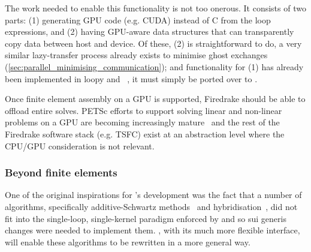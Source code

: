 \documentclass[thesis]{subfiles}
\begin{document}
The work needed to enable this functionality is not too onerous.
It consists of two parts:
(1) generating GPU code (e.g. CUDA) instead of C from the loop expressions, and
(2) having GPU-aware data structures that can transparently copy data between host and device.
Of these, (2) is straightforward to do, a very similar lazy-transfer process already exists to minimise ghost exchanges (\cref{sec:parallel_minimising_communication}); and functionality for (1) has already been implemented in loopy and ~\cite{fenics2021-kulkarni}, it must simply be ported over to .

Once finite element assembly on a GPU is supported, Firedrake should be able to offload entire solves.
PETSc efforts to support solving linear and non-linear problems on a GPU are becoming increasingly mature~\cite{MILLS2021102831,millsPETScTAODevelopments2024}
and the rest of the Firedrake software stack (e.g. TSFC) exist at an abstraction level where the CPU/GPU consideration is not relevant.

\subsubsection{Beyond finite elements}
\label{sec:more_stencils}

One of the original inspirations for 's development was the fact that a number of algorithms, specifically additive-Schwartz methods~\cite{farrellPCPATCHSoftwareTopological2021} and hybridisation~\cite{gibsonSlateExtendingFiredrake2020}, did not fit into the single-loop, single-kernel paradigm enforced by  and so sui generis changes were needed to implement them.
, with its much more flexible interface, will enable these algorithms to be rewritten in a more general way.
\end{document}

